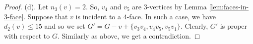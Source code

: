 \documentclass[10pt,a4paper]{amsart}
\begin{document}
\begin{proof}
(d). Let $n_3(v)=2$. So, $v_4$ and $v_5$ are $3$-vertices by Lemma \ref{lem:faces-in-3-face}.  Suppose that $v$ is incident to a $4$-face.  In such a case, we have $d_2(v)\leq 15$ and so we set $G'=G-v+\{v_3v_4,v_4v_5,v_5v_1\}$.  Clearly,  $G'$ is proper with respect to $G$.
Similarly as above, we get a contradiction. 
\end{proof}
\end{document}
